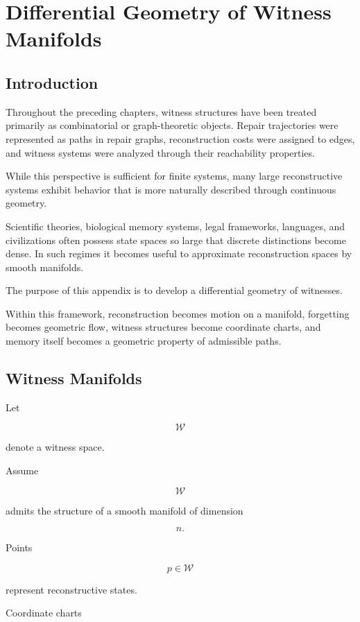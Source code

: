 \documentclass[12pt,oneside]{book}
\theoremstyle{plain} \newtheorem{theorem}{Theorem}[chapter] \newtheorem{lemma}[theorem]{Lemma} \newtheorem{proposition}[theorem]{Proposition} \newtheorem{corollary}[theorem]{Corollary}
\theoremstyle{definition} \newtheorem{definition}[theorem]{Definition} \newtheorem{axiom}[theorem]{Axiom} \newtheorem{construction}[theorem]{Construction}
\theoremstyle{remark} \newtheorem{remark}[theorem]{Remark} \newtheorem{example}[theorem]{Example}
\begin{document}
\chapter{Differential Geometry of Witness Manifolds}

\section{Introduction}

Throughout the preceding chapters, witness structures have been treated primarily as combinatorial or graph-theoretic objects. Repair trajectories were represented as paths in repair graphs, reconstruction costs were assigned to edges, and witness systems were analyzed through their reachability properties.

While this perspective is sufficient for finite systems, many large reconstructive systems exhibit behavior that is more naturally described through continuous geometry.

Scientific theories, biological memory systems, legal frameworks, languages, and civilizations often possess state spaces so large that discrete distinctions become dense. In such regimes it becomes useful to approximate reconstruction spaces by smooth manifolds.

The purpose of this appendix is to develop a differential geometry of witnesses.

Within this framework, reconstruction becomes motion on a manifold, forgetting becomes geometric flow, witness structures become coordinate charts, and memory itself becomes a geometric property of admissible paths.

\section{Witness Manifolds}

Let

\[
\mathcal W
\]

denote a witness space.

Assume

\[
\mathcal W
\]

admits the structure of a smooth manifold of dimension

\[
n.
\]

Points

\[
p\in\mathcal W
\]

represent reconstructive states.

Coordinate charts
\end{document}
